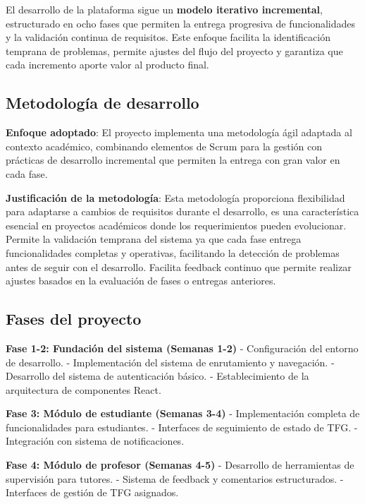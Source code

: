 \documentclass[12pt,a4paper,oneside]{report}
\begin{document}
El desarrollo de la plataforma sigue un \textbf{modelo iterativo incremental}, estructurado en ocho fases que permiten la entrega progresiva de funcionalidades y la validación continua de requisitos. Este enfoque facilita la identificación temprana de problemas, permite ajustes del flujo del proyecto y garantiza que cada incremento aporte valor al producto final.

\subsection{Metodología de
desarrollo}\label{metodologuxeda-de-desarrollo}

\textbf{Enfoque adoptado}: El proyecto implementa una metodología ágil
adaptada al contexto académico, combinando elementos de Scrum para la
gestión con prácticas de desarrollo incremental que permiten
la entrega con gran valor en cada fase.

\textbf{Justificación de la metodología}: Esta metodología proporciona flexibilidad para adaptarse a cambios de requisitos durante el desarrollo, es una característica esencial en proyectos académicos donde los requerimientos pueden evolucionar. Permite la validación temprana del sistema ya que cada fase entrega funcionalidades completas y operativas, facilitando la detección de problemas antes de seguir con el desarrollo. Facilita feedback continuo que permite realizar ajustes basados en la evaluación de fases o entregas anteriores.

\subsection{Fases del proyecto}\label{fases-del-proyecto}

\textbf{Fase 1-2: Fundación del sistema (Semanas 1-2)} - Configuración
del entorno de desarrollo. - Implementación del sistema de enrutamiento y
navegación. - Desarrollo del sistema de autenticación básico. -
Establecimiento de la arquitectura de componentes React.

\textbf{Fase 3: Módulo de estudiante (Semanas 3-4)} - Implementación
completa de funcionalidades para estudiantes. - Interfaces de seguimiento de estado de TFG. -
Integración con sistema de notificaciones.

\textbf{Fase 4: Módulo de profesor (Semanas 4-5)} - Desarrollo de
herramientas de supervisión para tutores. - Sistema de feedback y
comentarios estructurados. - Interfaces de gestión de TFG asignados.
\end{document}
